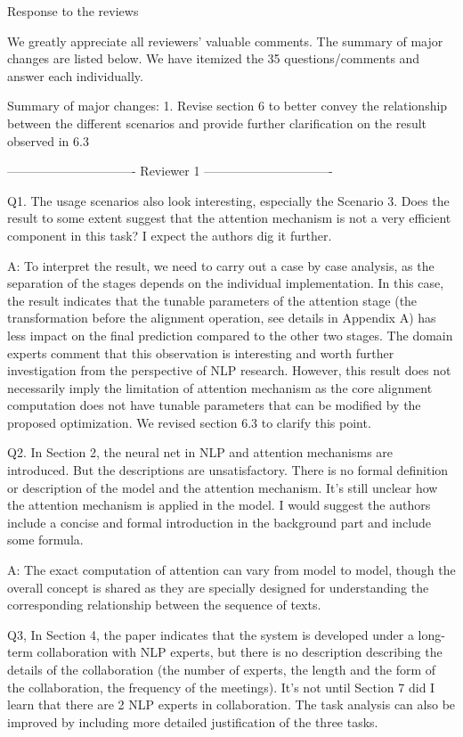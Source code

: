 Response to the reviews

We greatly appreciate all reviewers' valuable comments. The summary of major changes are listed below. We have itemized the 35 questions/comments and answer each individually.

Summary of major changes:
1. Revise section 6 to better convey the relationship between the different scenarios and provide further clarification on the result observed in 6.3


------------------------------- Reviewer 1 -------------------------------


Q1. The usage scenarios also look interesting, especially the Scenario 3. Does the result to some extent suggest that the attention mechanism is not a very efficient component in this task? I expect the authors dig it further.

A: To interpret the result, we need to carry out a case by case analysis, as the separation of the stages depends on the individual implementation. In this case, the result indicates that the tunable parameters of the attention stage (the transformation before the alignment operation, see details in Appendix A) has less impact on the final prediction compared to the other two stages. The domain experts comment that this observation is interesting and worth further investigation from the perspective of NLP research. However, this result does not necessarily imply the limitation of attention mechanism as the core alignment computation does not have tunable parameters that can be modified by the proposed optimization. We revised section 6.3 to clarify this point.


Q2. In Section 2, the neural net in NLP and attention mechanisms are introduced. But the descriptions are unsatisfactory. There is no formal definition or description of the model and the attention mechanism. It's still unclear how the attention mechanism is applied in the model. I would suggest the authors include a concise and formal introduction in the background part and include some formula.

A: The exact computation of attention can vary from model to model, though the overall concept is shared as they are specially designed for understanding the corresponding relationship between the sequence of texts.

Q3, In Section 4, the paper indicates that the system is developed under a long-term collaboration with NLP experts, but there is no description describing the details of the collaboration (the number of experts, the length and the form of the collaboration, the frequency of the meetings). It's not until Section 7 did I learn that there are 2 NLP experts in collaboration. The task analysis can also be improved by including more detailed justification of the three tasks.

